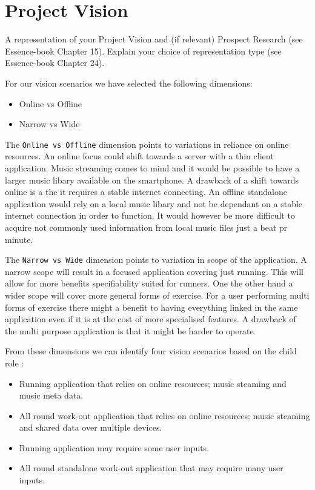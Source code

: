 \section{Project Vision}
A representation of your Project Vision and (if relevant) Prospect Research (see Essence-book Chapter 15).
Explain your choice of representation type (see Essence-book Chapter 24).

For our vision scenarios \cite[ p. 127]{essence} we have selected the following dimensions:
\begin{itemize}
\item Online vs Offline %
\item Narrow vs Wide
\end{itemize}

The \texttt{Online vs Offline} dimension points to variations in reliance on online resources. An online focus could shift  towards a server with a thin client application. Music streaming comes to mind and it would be possible to have a larger music libary available on the smartphone. A drawback of a shift towards online is a the it requires a stable internet connecting. An offline standalone application would rely on a local music libary and not be dependant on a stable internet connection in order to function. It would however be more difficult to acquire not commonly used information from local music files just a beat pr minute.


The \texttt{Narrow vs Wide} dimension points to variation in scope of the application. A narrow scope will result in a focused application covering just running. This will allow for more benefits specifiability suited for runners. One the other hand a wider scope will cover more general forms of exercise. For a user performing multi forms of exercise there might a benefit to having everything linked in the same application even if it is at the cost of more specialised features. A drawback of the multi purpose application is that it might be harder to operate.

From these dimensions we can identify four vision scenarios based on the child role  \cite[ pp. 132-134]{essence}:

\begin{itemize}
\item Running application that relies on online resources; music steaming and music meta data. %
\item All round work-out application that relies on online resources; music steaming and shared data over multiple devices. %
\item Running application may require some user inputs. %
\item All round standalone work-out application that may require many user inputs. %
\end{itemize}

